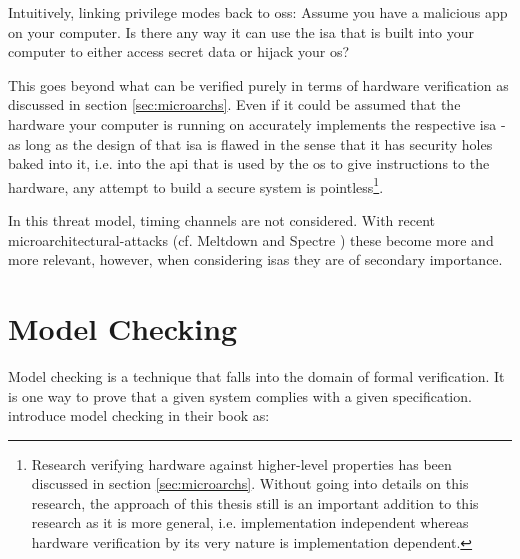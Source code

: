 Intuitively, linking privilege modes back to \glspl{os}: Assume you have a malicious app on your computer.
Is there any way it can use the \gls{isa} that is built into your computer to either access secret data or hijack your \gls{os}?

This goes beyond what can be verified purely in terms of hardware verification as discussed in section \ref{sec:microarchs}.
Even if it could be assumed that the hardware your computer is running on accurately implements the respective \gls{isa} - as long as the design of that \gls{isa} is flawed in the sense that it has security holes baked into it, i.e. into the \gls{api} that is used by the \gls{os} to give instructions to the hardware, any attempt to build a secure system is pointless\footnote{%
    Research verifying hardware against higher-level properties has been discussed in section \ref{sec:microarchs}.
    Without going into details on this research, the approach of this thesis still is an important addition to this research as it is more general, i.e. implementation independent whereas hardware verification by its very nature is implementation dependent.
}.

In this threat model, timing channels are not considered.
With recent microarchitectural-attacks (cf. Meltdown \cite{Lipp2018meltdown} and Spectre \cite{Kocher2018spectre}) these become more and more relevant, however, when considering \glspl{isa} they are of secondary importance.

\section{Model Checking}
\label{sec:model-checking}

Model checking is a technique that falls into the domain of formal verification.
It is one way to prove that a given system complies with a given specification.
\citeauthor{Baier08} introduce model checking in their book  \cite{Baier08} as:

